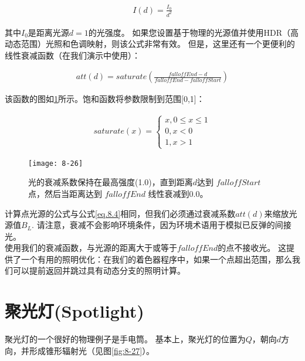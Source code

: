 \begin{align*}
I(d)=\frac{I_{0}}{d^{2}}
\end{align*}

\begin{flushleft}
其中$I_{0}$是距离光源$d=1$的光强度。 如果您设置基于物理的光源值并使用HDR（高动态范围）光照和色调映射，则该公式非常有效。 但是，这里还有一个更便利的线性衰减函数（在我们演示中使用）：\\
\end{flushleft}

\begin{align*}
att(d)=saturate(\frac{falloffEnd-d}{falloffEnd-falloffStart})
\end{align*}

\begin{flushleft}
该函数的图如\ref{fig:8-26}所示。饱和函数将参数限制到范围[0,1]：\\
\end{flushleft}

\begin{align*}
saturate(x)=\left\{\begin{matrix}
x,0\leq x\leq 1 \\
0,x < 0\\
1,x > 1
\end{matrix}\right.
\end{align*}

\begin{figure}[h]
    \texttt{[image: 8-26]}
    \centering
    \caption{光的衰减系数保持在最高强度(1.0)，直到距离$d$达到 $falloffStart$ 点，然后当距离达到 $falloffEnd$ 线性衰减到0.0。}
    \label{fig:8-26}
\end{figure}

\begin{flushleft}
计算点光源的公式与公式\ref{eq.8.4}相同，但我们必须通过衰减系数$att(d)$来缩放光源值$B_{L}$. 请注意，衰减不会影响环境条件，因为环境术语用于模拟已反弹的间接光。\\
使用我们的衰减函数，与光源的距离大于或等于$falloffEnd$的点不接收光。 这提供了一个有用的照明优化：在我们的着色器程序中，如果一个点超出范围，那么我们可以提前返回并跳过具有动态分支的照明计算。
\end{flushleft}

\section{聚光灯(Spotlight)}
\begin{flushleft}
聚光灯的一个很好的物理例子是手电筒。 基本上，聚光灯的位置为$Q$，朝向$d$方向，并形成锥形辐射光（见图\ref{fig:8-27}）。
\end{flushleft}

